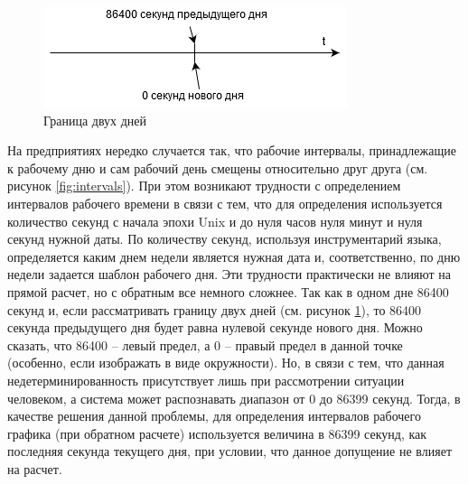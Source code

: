 \begin{figure}[h!]
	\centering
	\includegraphics[width=0.6\linewidth]{pics/scheduleTime.png}
	\caption{Граница двух дней}
	\label{fig:time}
\end{figure}

\indent На предприятиях нередко случается так, что рабочие интервалы, принадлежащие к рабочему дню и сам рабочий день смещены относительно друг друга (см. рисунок \ref{fig:intervals}).
При этом возникают трудности с определением интервалов рабочего времени в связи с тем, что для определения используется количество секунд с начала эпохи Unix и до нуля часов нуля минут и нуля секунд нужной даты.
По количеству секунд, используя инструментарий языка, определяется каким днем недели является нужная дата и, соответственно, по дню недели задается шаблон рабочего дня.
Эти трудности практически не влияют на прямой расчет, но с обратным все немного сложнее.
Так как в одном дне 86400 секунд и, если рассматривать границу двух дней (см. рисунок \ref{fig:time}), то 86400 секунда предыдущего дня будет равна нулевой секунде нового дня.
Можно сказать, что 86400 -- левый предел, а 0 -- правый предел в данной точке (особенно, если изображать в виде окружности).
Но, в связи с тем, что данная недетерминированность присутствует лишь при рассмотрении ситуации человеком, а система может распознавать диапазон от 0 до 86399 секунд.
Тогда, в качестве решения данной проблемы, для определения интервалов рабочего графика (при обратном расчете) используется величина в 86399 секунд, как последняя секунда текущего дня, при условии, что данное допущение не влияет на расчет.


